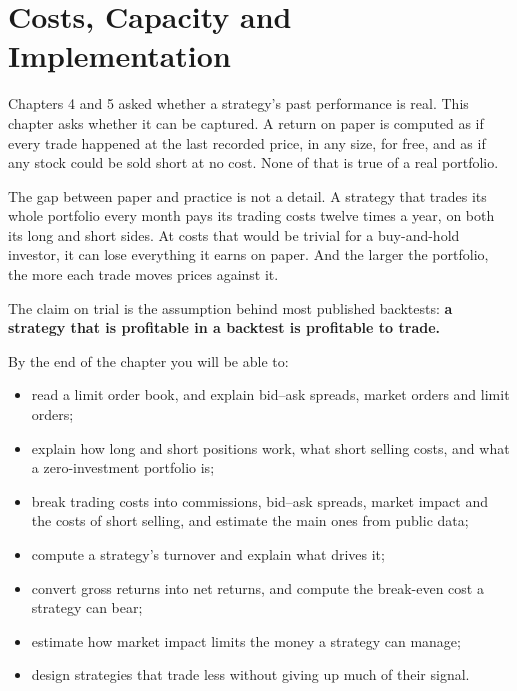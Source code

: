 \makeatletter
{}
\makeatother

\chapter{Costs, Capacity and Implementation}
\label{ch:06}

Chapters 4 and 5 asked whether a strategy's past performance is real. This chapter asks whether it can be captured. A return on paper is computed as if every trade happened at the last recorded price, in any size, for free, and as if any stock could be sold short at no cost. None of that is true of a real portfolio.

The gap between paper and practice is not a detail. A strategy that trades its whole portfolio every month pays its trading costs twelve times a year, on both its long and short sides. At costs that would be trivial for a buy-and-hold investor, it can lose everything it earns on paper. And the larger the portfolio, the more each trade moves prices against it.

The claim on trial is the assumption behind most published backtests: \textbf{a strategy that is profitable in a backtest is profitable to trade.}

By the end of the chapter you will be able to:

\begin{itemize}
  \item read a limit order book, and explain bid--ask spreads, market orders and limit orders;
  \item explain how long and short positions work, what short selling costs, and what a zero-investment portfolio is;
  \item break trading costs into commissions, bid--ask spreads, market impact and the costs of short selling, and estimate the main ones from public data;
  \item compute a strategy's turnover and explain what drives it;
  \item convert gross returns into net returns, and compute the break-even cost a strategy can bear;
  \item estimate how market impact limits the money a strategy can manage;
  \item design strategies that trade less without giving up much of their signal.
\end{itemize}


